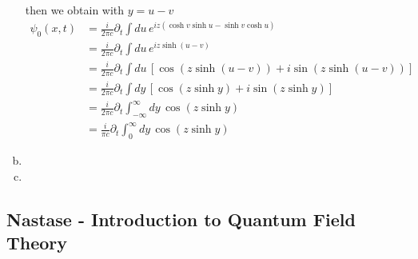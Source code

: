 \documentclass[10pt,a4paper]{book}
\theoremstyle{definition}
\begin{document}
\begin{enumerate}[(a)]
then we obtain with $y=u-v$
\begin{align}
\psi_0(x,t)
&=\frac{i}{2\pi c}\partial_t\int du\,e^{iz(\cosh v\sinh u-\sinh v\cosh u)}\\
&=\frac{i}{2\pi c}\partial_t\int du\,e^{iz\sinh (u-v)}\\
&=\frac{i}{2\pi c}\partial_t\int du\,\left[\cos(z\sinh (u-v))+i\sin(z\sinh (u-v))\right]\\
&=\frac{i}{2\pi c}\partial_t\int dy\,\left[\cos(z\sinh y)+i\sin(z\sinh y)\right]\\
&=\frac{i}{2\pi c}\partial_t\int_{-\infty}^\infty dy\,\cos(z\sinh y)\\
&=\frac{i}{\pi c}\partial_t\int_0^\infty dy\,\cos(z\sinh y)
\end{align}



\item

\item

\end{enumerate}

\subsection{{\sc Nastase} - Introduction to Quantum Field Theory} 
\end{document}
